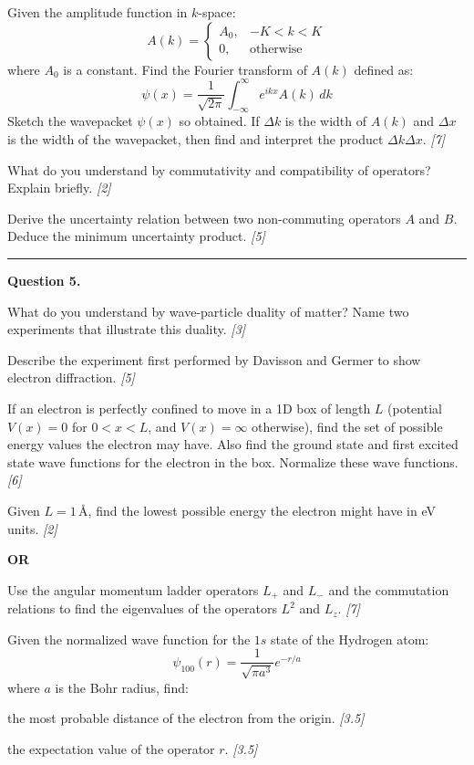 \documentclass[11pt,a4paper]{article}
\newcommand{\pts}[1]{\hfill   \textit{[#1]}}
\begin{document}
\begin{parts}
  \item Given the amplitude function in $k$-space:
    \[ A(k) = 
\begin{cases} A_0, & -K < k < K \\ 0, &  \text{otherwise} \end{cases} \]
    where $A_0$ is a constant. Find the Fourier transform of $A(k)$ defined as:
    \[ \psi(x) = \frac{1}{\sqrt{2\pi}} \int_{-\infty}^{\infty} e^{ikx} A(k) \, dk \]
    Sketch the wavepacket $\psi(x)$ so obtained. If $\Delta k$ is the width of $A(k)$ and $\Delta x$ is the width of the wavepacket, then find and interpret the product $\Delta k \Delta x$. \pts{7}
  \item What do you understand by commutativity and compatibility of operators? Explain briefly. \pts{2}
  \item Derive the uncertainty relation between two non-commuting operators $A$ and $B$. Deduce the minimum uncertainty product. \pts{5}
\end{parts}

\medskip\rule{\linewidth}{0.2pt}




\noindent   \textbf{Question 5.}

\begin{parts}
  \item What do you understand by wave-particle duality of matter? Name two experiments that illustrate this duality. \pts{3}
  \item Describe the experiment first performed by Davisson and Germer to show electron diffraction. \pts{5}
  \item If an electron is perfectly confined to move in a 1D box of length $L$ (potential $V(x) = 0$ for $0 < x < L$, and $V(x) = \infty$ otherwise), find the set of possible energy values the electron may have. Also find the ground state and first excited state wave functions for the electron in the box. Normalize these wave functions. \pts{6}
  \item Given $L = 1\, \text{\AA}$, find the lowest possible energy the electron might have in eV units. \pts{2}
\end{parts}
\hfill   \textbf{OR}

\begin{parts}
  \item Use the angular momentum ladder operators $L_+$ and $L_-$ and the commutation relations to find the eigenvalues of the operators $L^2$ and $L_z$. \pts{7}
  \item Given the normalized wave function for the $1s$ state of the Hydrogen atom:
    \[ \psi_{100}(r) = \frac{1}{\sqrt{\pi a^3}} e^{-r/a} \]
    where $a$ is the Bohr radius, find:
    
\begin{parts}
      \item the most probable distance of the electron from the origin. \pts{3.5}
      \item the expectation value of the operator $r$. \pts{3.5}
    \end{parts}
\end{parts}
\end{document}
